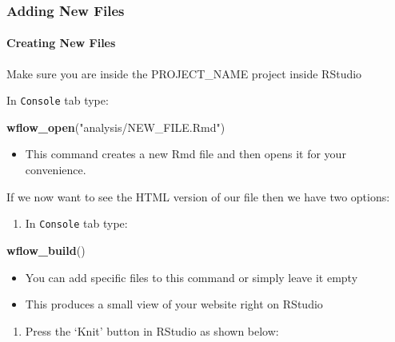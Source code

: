 \documentclass[openany]{article}
\newenvironment{Shaded}{\begin{snugshade}}{\end{snugshade}}
\newcommand{\KeywordTok}[1]{\textcolor[rgb]{0.13,0.29,0.53}{\textbf{#1}}}
\newcommand{\NormalTok}[1]{#1}
\newcommand{\StringTok}[1]{\textcolor[rgb]{0.31,0.60,0.02}{#1}}
\providecommand{\tightlist}{%
  \setlength{\itemsep}{0pt}\setlength{\parskip}{0pt}}
\let\oldparagraph\paragraph
\renewcommand{\paragraph}[1]{\oldparagraph{#1}\mbox{}}
\begin{document}
\hypertarget{adding-new-files}{%
\subsubsection{Adding New Files}\label{adding-new-files}}

\hypertarget{creating-new-files}{%
\paragraph{Creating New Files}\label{creating-new-files}}

Make sure you are inside the PROJECT\_NAME project inside RStudio

In \texttt{Console} tab type:

\begin{Shaded}
\begin{Highlighting}[]
\KeywordTok{wflow_open}\NormalTok{(}\StringTok{"analysis/NEW_FILE.Rmd"}\NormalTok{)}
\end{Highlighting}
\end{Shaded}

\begin{itemize}
\tightlist
\item
  This command creates a new Rmd file and then opens it for your convenience.
\end{itemize}

If we now want to see the HTML version of our file then we have two options:

\begin{enumerate}
\def\labelenumi{\arabic{enumi}.}
\tightlist
\item
  In \texttt{Console} tab type:
\end{enumerate}

\begin{Shaded}
\begin{Highlighting}[]
\KeywordTok{wflow_build}\NormalTok{()}
\end{Highlighting}
\end{Shaded}

\begin{itemize}
\tightlist
\item
  You can add specific files to this command or simply leave it empty
\item
  This produces a small view of your website right on RStudio
\end{itemize}

\begin{enumerate}
\def\labelenumi{\arabic{enumi}.}
\setcounter{enumi}{1}
\tightlist
\item
  Press the `Knit' button in RStudio as shown below:
\end{enumerate}
\end{document}
